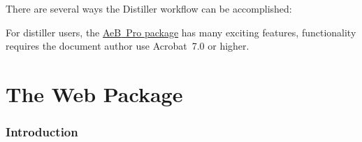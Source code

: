 \documentclass{article}
\def\AEB{\textsf{AeB}}
\begin{document}
There are several ways the Distiller workflow can be accomplished:
%
%
%
%
%
%

\newtopic For distiller users, the
\href{http://www.math.uakron.edu/~dpstory/aeb_pro.html}{\AEB\ Pro package}
has many exciting features, functionality requires the document author use
Acrobat~7.0 or higher.



\part{The Web Package}\label{s:web}

\section{Introduction}
\end{document}
